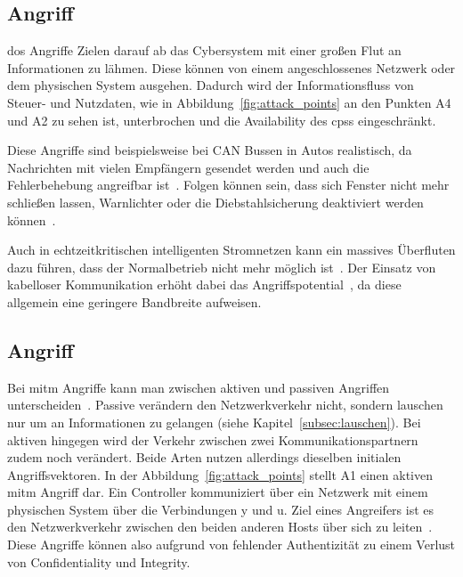 \documentclass[final,bibliography=totocnumbered]{include/sikseminar}
\newcommand{\cps}{\glspl{cps}\xspace}
\begin{document}
\subsection{ Angriff}\label{subsec:dos}

\gls{dos} Angriffe Zielen darauf ab das Cybersystem mit einer großen Flut an Informationen zu lähmen.
Diese können von einem angeschlossenes Netzwerk oder dem physischen System ausgehen.
Dadurch wird der Informationsfluss von Steuer- und Nutzdaten, wie in Abbildung~\ref{fig:attack_points} an den Punkten A4 und A2 zu sehen ist, unterbrochen und die Availability des \cps eingeschränkt.

Diese Angriffe sind beispielsweise bei CAN Bussen in Autos realistisch, da Nachrichten mit vielen Empfängern gesendet werden und auch die Fehlerbehebung angreifbar ist~\cite{HUM 81,26}.%
Folgen können sein, dass sich Fenster nicht mehr schließen lassen, Warnlichter oder die Diebstahlsicherung deaktiviert werden können~\cite{HUM 68}.

Auch in echtzeitkritischen intelligenten Stromnetzen kann ein massives Überfluten dazu führen, dass der Normalbetrieb nicht mehr möglich ist~\cite{HUM 98}.
Der Einsatz von kabelloser Kommunikation erhöht dabei das Angriffspotential~\cite{HUM 99}, da diese allgemein eine geringere Bandbreite aufweisen.
\subsection{ Angriff}\label{subsec:mitm}
Bei \gls{mitm} Angriffe kann man zwischen aktiven und passiven Angriffen unterscheiden~\cite{WYX+10}.%
Passive verändern den Netzwerkverkehr nicht, sondern lauschen nur um an Informationen zu gelangen (siehe Kapitel~\ref{subsec:lauschen}).
Bei aktiven hingegen wird der Verkehr zwischen zwei Kommunikationspartnern zudem noch verändert.
Beide Arten nutzen allerdings dieselben initialen Angriffsvektoren.
In der Abbildung~\ref{fig:attack_points} stellt A1 einen aktiven \gls{mitm} Angriff dar.
Ein Controller kommuniziert über ein Netzwerk mit einem physischen System über die Verbindungen y und u.
Ziel eines Angreifers ist es den Netzwerkverkehr zwischen den beiden anderen Hosts über sich zu leiten~\cite{WYX+10,FPA+18}.
Diese Angriffe können also aufgrund von fehlender Authentizität zu einem Verlust von Confidentiality und Integrity.
\end{document}
